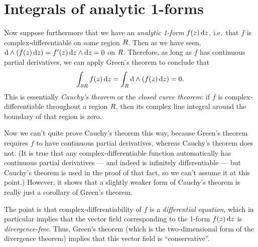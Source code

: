 \documentclass[12pt]{amsart}
\begin{document}
\section{Integrals of analytic 1-forms}
\label{sec:integrals-of-analytic-1forms}

Now suppose furthermore that we have an \emph{analytic 1-form} $f(z) \,{\mathrm{d} z}$, i.e.\ that $f$ is complex-differentiable on some region $R$.
Then as we have seen, $\mathrm{d}\wedge(f(z)\,{\mathrm{d} z}) = f'(z)\,{\mathrm{d} z} \wedge{\ensuremath{\mathrm{d} z}} = 0$ on $R$.
Therefore, as long as $f$ has continuous partial derivatives, we can apply Green's theorem to conclude that
\[ \int_{\partial R} f(z)\,{\mathrm{d} z} = \int_{R} \mathrm{d}\wedge(f(z)\,{\mathrm{d} z}) = 0. \]
This is essentially \emph{Cauchy's theorem} or the \emph{closed curve theorem}: if $f$ is complex-differentiable throughout a region $R$, then its complex line integral around the boundary of that region is zero.

Now we can't quite prove Cauchy's theorem this way, because Green's theorem requires $f$ to have continuous partial derivatives, whereas Cauchy's theorem does not.
(It is true that any complex-differentiable function automatically has continuous partial derivatives --- and indeed is infinitely differentiable --- but Cauchy's theorem is used in the proof of that fact, so we can't assume it at this point.)
However, it shows that a slightly weaker form of Cauchy's theorem is really just a corollary of Green's theorem.

The point is that complex-differentiability of $f$ is a \emph{differential equation}, which in particular implies that the vector field corresponding to the 1-form $f(z)\,{\mathrm{d} z}$ is \emph{divergence-free}.
Thus, Green's theorem (which is the two-dimensional form of the divergence theorem) implies that this vector field is ``conservative''.
\end{document}
